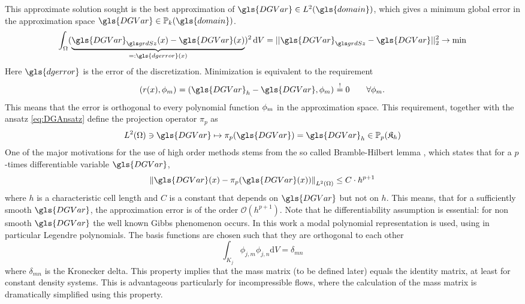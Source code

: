This approximate solution sought  is the best approximation of $\gls{DGVar} \in L^2(\gls{domain})$, which gives a minimum global error in the approximation space $\gls{DGVar} \in \mathbb{P}_k(\gls{domain} )$. 
\begin{align}
	\int_{\domain} (\underbrace{ \nuM{\gls{DGVar}}(x)-\gls{DGVar}(x) }_{=: \gls{dgerror}(x)})^2 \dV
	= ||\nuM{\gls{DGVar}} - \gls{DGVar}||_2^2 \rightarrow \text{min}
\end{align}
Here $\gls{dgerror}$ is the error of the discretization. Minimization is equivalent to the requirement 
\begin{equation}
	\label{eq:L2projection}
	\scp{r(x)}{\basis{}_m} = \scp{\gls{DGVar}_h-\gls{DGVar}}{\basis{}_m} \stackrel{!}{=} 0 \qquad \forall\basis{}_m.
\end{equation}
This means that the error is orthogonal to every polynomial function $ \phi{}_m$ in the approximation space. This requirement, together with the ansatz \cref{eq:DGAnsatz} define the projection operator $\pi_p$ as
\begin{equation}
	L^2(\domain) \ni \gls{DGVar} \mapsto \pi_p(\gls{DGVar}) = \gls{DGVar}_h \in  \poly_p( \NumericalGrid )
	\label{eq:ProjOperatorMapping}
\end{equation}
One of the major motivations for the use of high order methods stems from the so called Bramble-Hilbert lemma \parencite{brambleEstimationLinearFunctionals1970}, which states that for a $p$-times differentiable variable $\gls{DGVar}$, %
\begin{equation}
	\LTwoNorm{\gls{DGVar}(x) - \pi_p(\gls{DGVar}(x))} \leq C \cdot h^{p+1}
\end{equation}
where $h$ is a characteristic cell length and $C$ is a constant that depends on $\gls{DGVar}$ but not on $h$. This means, that for a sufficiently smooth $\gls{DGVar}$, the approximation error is of the order $\mathcal{O}(h^{p+1})$. Note that he differentiability assumption is essential: for non smooth $\gls{DGVar}$ the well known Gibbs phenomenon occurs.
In this work a modal polynomial representation is used, using in particular Legendre polynomials. The basis functions are chosen such that they are orthogonal to each other 
\begin{equation}
	\int_{K_j} \phi_{j,m}\phi_{j,n} \text{d}V= \delta_{mn}
\end{equation}
where $\delta_{mn}$ is the Kronecker delta. This property implies that the mass matrix (to be defined later) equals the identity matrix, at least for constant density systems. This is advantageous particularly for incompressible flows, where the calculation of the mass matrix is dramatically simplified using this property. 
